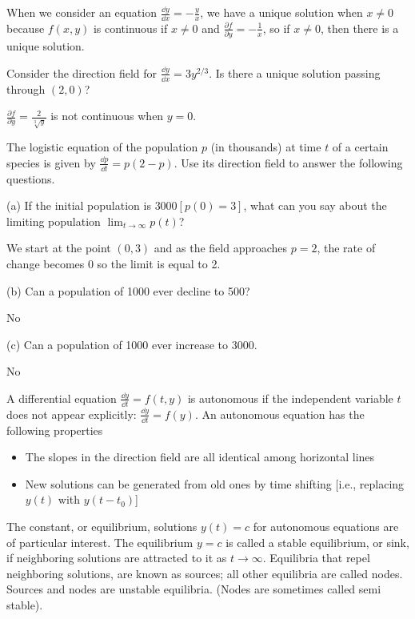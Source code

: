 \documentclass[../diffeq.tex]{subfiles}
\begin{document}
When we consider an equation $\frac{\dd y}{\dd x}=-\frac{y}{x}$, we have a unique solution when $x\neq 0$ because $f(x,y)$ is continuous if $x\neq 0$ and $\frac{\partial f}{\partial y}=-\frac{1}{x}$, so if $x\neq 0$, then there is a unique solution.

\begin{example}
    Consider the direction field for $\frac{\dd y}{\dd x}=3y^{2/3}$. Is there a unique solution passing through $(2,0)$?

    $\frac{\partial f}{\partial y}=\frac{2}{\sqrt[3]{y}}$ is not continuous when $y=0$.
\end{example}

\begin{example}
    The logistic equation of the population $p$ (in thousands) at time $t$ of a certain species is given by $\frac{\dd p}{\dd t}=p(2-p)$. Use its direction field to answer the following questions.

    (a) If the initial population is $3000[p(0)=3]$, what can you say about the limiting population $\lim_{t\to \infty}p(t)$?

    We start at the point $(0,3)$ and as the field approaches $p=2$, the rate of change becomes 0 so the limit is equal to 2.

    (b) Can a population of 1000 ever decline to 500?

    No 

    (c) Can a population of 1000 ever increase to 3000.

    No 
\end{example}

A differential equation $\frac{\dd y}{\dd t}=f(t,y)$ is autonomous if the independent variable $t$ does not appear explicitly: $\frac{\dd y}{\dd t}=f(y)$. An autonomous equation has the following properties
\begin{itemize}
    \item The slopes in the direction field are all identical among horizontal lines 
    \item New solutions can be generated from old ones by time shifting [i.e., replacing $y(t)$ with $y(t-t_0)$]
\end{itemize}

The constant, or equilibrium, solutions $y(t)=c$ for autonomous equations are of particular interest. The equilibrium $y=c$ is called a stable equilibrium, or sink, if neighboring solutions are 
attracted to it as $t\rightarrow \infty$. Equilibria that repel neighboring solutions, are known as sources; all other equilibria are called nodes. Sources and nodes are unstable equilibria. (Nodes are sometimes called semi stable).
\end{document}
